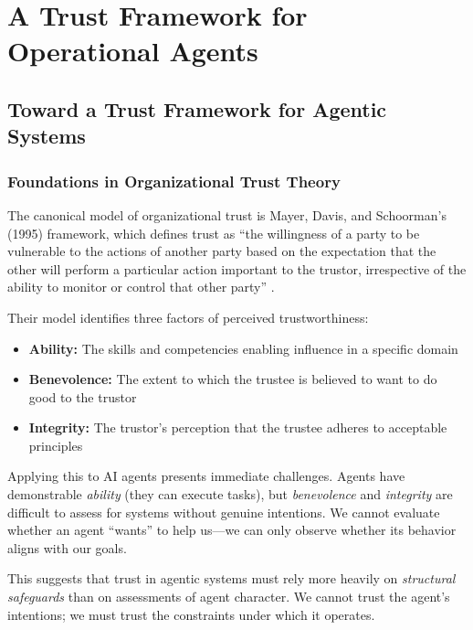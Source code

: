 \chapter{A Trust Framework for Operational Agents}
\label{ch:trust-framework}


\section{Toward a Trust Framework for Agentic Systems}
\label{sec:toward-framework}

\subsection{Foundations in Organizational Trust Theory}
\label{subsec:org-trust-foundations}

The canonical model of organizational trust is Mayer, Davis, and Schoorman's (1995) framework, which defines trust as ``the willingness of a party to be vulnerable to the actions of another party based on the expectation that the other will perform a particular action important to the trustor, irrespective of the ability to monitor or control that other party'' \citep{mayer1995}.

Their model identifies three factors of perceived trustworthiness:
\begin{itemize}
    \item \textbf{Ability:} The skills and competencies enabling influence in a specific domain
    \item \textbf{Benevolence:} The extent to which the trustee is believed to want to do good to the trustor
    \item \textbf{Integrity:} The trustor's perception that the trustee adheres to acceptable principles
\end{itemize}

Applying this to AI agents presents immediate challenges. Agents have demonstrable \textit{ability} (they can execute tasks), but \textit{benevolence} and \textit{integrity} are difficult to assess for systems without genuine intentions. We cannot evaluate whether an agent ``wants'' to help us---we can only observe whether its behavior aligns with our goals.

This suggests that trust in agentic systems must rely more heavily on \textit{structural safeguards} than on assessments of agent character. We cannot trust the agent's intentions; we must trust the constraints under which it operates.

